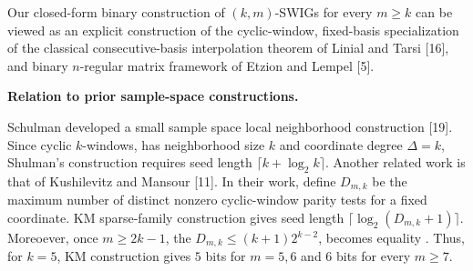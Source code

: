 \documentclass[10pt,a4paper]{article}
\begin{document}




Our closed-form binary construction of $(k,m)$-SWIGs for every $m\geq k$
can be viewed as an explicit construction of the cyclic-window, fixed-basis
specialization of the classical consecutive-basis interpolation theorem of
Linial and Tarsi [16], and binary
$n$-regular matrix framework of Etzion and Lempel [5].\par




\par\medskip\noindent\textbf{Relation to prior sample-space constructions.}\par




Schulman developed a small sample space local neighborhood
construction [19]. Since cyclic $k$-windows, has neighborhood size $k$ and coordinate degree
$\Delta=k$, Shulman’s construction requires seed length $\lceil k+\log_{2}k\rceil$. Another related work is that of
Kushilevitz and Mansour [11]. In their work,
define $D_{m,k}$ be the maximum number
of distinct nonzero cyclic-window parity tests for a fixed
coordinate. KM sparse-family construction gives seed length
$\lceil\log_{2}(D_{m,k}+1)\rceil$. Moreoever, once $m\geq 2k-1$, the
$D_{m,k}\leq(k+1)2^{k-2}$, becomes equality . Thus,
for $k=5$, KM construction gives $5$ bits for $m=5,6$
and $6$ bits for every $m\geq 7$.\par
\end{document}
